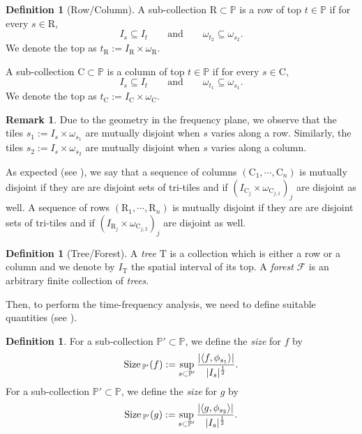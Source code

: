 \documentclass[a4paper,11pt,oneside]{amsart}
\newcommand{\PP}{\mathbb{P}}
\newcommand{\FF}{\mathcal{F}}
\newcommand{\CC}{\mathrm{C}}
\newcommand{\RR}{\mathrm{R}}
\newcommand{\TT}{\mathrm{T}}
\newcommand{\size}{\mathrm{Size\, }}
\theoremstyle{plain}
\theoremstyle{definition}
\newtheorem{definition}[theorem]{Definition}
\newtheorem{remark}[theorem]{Remark}
\begin{document}
\begin{definition}[Row/Column] A sub-collection $\RR \subset \PP$ is a row of top $t\in \PP$ if for every $s\in \RR$, 
\[
I_s \subseteq I_t \qquad \text{and} \qquad \omega_{t_2} \subseteq \omega_{s_2}.
\]
We denote the top as $t_{\RR}:=I_{\RR} \times \omega_{\RR}$.

A sub-collection $\CC \subset \PP$ is a column of top $t\in\PP$ if for every $s\in \CC$, 
\[
I_s \subseteq I_t \qquad \text{and} \qquad \omega_{t_1} \subseteq \omega_{s_1}.
\]
We denote the top as $t_{\CC}:=I_{\CC} \times \omega_{\CC}$.
\end{definition}

\begin{remark} Due to the geometry in the frequency plane, we observe that the tiles $s_1:=I_{s} \times \omega_{s_1}$ are mutually disjoint when $s$ varies along a row.
Similarly, the tiles $s_2:=I_{s} \times \omega_{s_2}$ are mutually disjoint when $s$ varies along a column.
\end{remark}

As expected (see \cite[Definition 2.4]{BB}), we say that a sequence of columns $(\CC_1,\cdots , \CC_n)$ is mutually disjoint if they are are disjoint sets of tri-tiles and if $(I_{\CC_j} \times \omega_{\CC_{j,1}})_{j}$ are disjoint as well.
A sequence of rows $(\RR_1,\cdots, \RR_n)$ is mutually disjoint if they are are disjoint sets of tri-tiles and if $(I_{\RR_j} \times \omega_{\CC_{j,2}})_{j}$ are disjoint as well.

\begin{definition}[Tree/Forest]
A {\it tree} $\TT$ is a collection which is either a row or a column and we denote by $I_{\TT}$ the spatial interval of its top. 
A {\it forest} $\FF$ is an arbitrary finite collection of {\it trees}.
\end{definition}

Then, to perform the time-frequency analysis, we need to define suitable quantities (see \cite[Definition 3.1]{BB}).

\begin{definition} For a sub-collection $\PP' \subset \PP$, we define the {\it size} for $f$ by
$$ \size_{\PP'}(f) := \sup_{s \subset \PP'} \frac{|\langle f, \phi_{s_1} \rangle |}{|I_s|^{1\over 2}}.$$
For a sub-collection $\PP' \subset \PP$, we define the {\it size} for $g$ by
$$ \size_{\PP'}(g) := \sup_{s \subset \PP'} \frac{|\langle g, \phi_{s_2} \rangle |}{|I_s|^{1 \over 2}}.$$
\end{definition}
\end{document}

